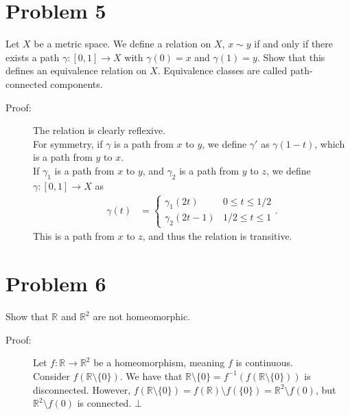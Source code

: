 \documentclass[10pt]{extarticle}
\newcommand{\R}{\mathbb{R}}
\begin{document}
  \section{Problem 5}%
  Let $X$ be a metric space. We define a relation on $X$, $x\sim y$ if and only if there exists a path $\gamma: [0,1] \rightarrow X$ with $\gamma(0) = x$ and $\gamma(1) = y$. Show that this defines an equivalence relation on $X$. Equivalence classes are called path-connected components.
  \begin{description}
    \item[Proof:] The relation is clearly reflexive.\\

      For symmetry, if $\gamma$ is a path from $x$ to $y$, we define $\gamma'$ as $\gamma(1-t)$, which is a path from $y$ to $x$.\\

      If $\gamma_1$ is a path from $x$ to $y$, and $\gamma_2$ is a path from $y$ to $z$, we define $\gamma: [0,1]\rightarrow X$ as
      \begin{align*}
        \gamma(t) &= \begin{cases}
          \gamma_1(2t) & 0 \leq t \leq 1/2\\
          \gamma_2(2t - 1) & 1/2 \leq t \leq 1
        \end{cases}.
      \end{align*}
      This is a path from $x$ to $z$, and thus the relation is transitive.
  \end{description}
  \section{Problem 6}%
  Show that $\R$ and $\R^2$ are not homeomorphic.
  \begin{description}
    \item[Proof:] Let $f: \R\rightarrow \R^2$ be a homeomorphism, meaning $f$ is continuous.\\

      Consider $f(\R\setminus \{0\})$. We have that $\R\setminus \{0\} = f^{-1}\left(f(\R\setminus \{0\})\right)$ is disconnected. However, $f(\R\setminus \{0\}) = f(\R)\setminus f(\{0\}) = \R^2\setminus f(0)$, but $\R^2\setminus f(0)$ is connected. $\bot$
  \end{description}
\end{document}
